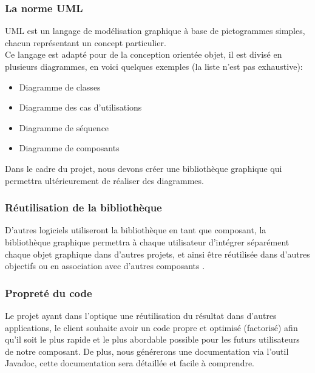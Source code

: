 \documentclass[12pt,a4paper,openany]{article}
\begin{document}
		\subsubsection{La norme UML} 
			UML est un langage de modélisation graphique à base de pictogrammes simples, chacun représentant un concept particulier.\\
			Ce langage est adapté pour de la conception orientée objet, il est divisé en plusieurs diagrammes, en voici quelques exemples (la liste n'est pas exhaustive): 
			\begin{itemize}
				\item Diagramme de classes
				\item Diagramme des cas d'utilisations
				\item Diagramme de séquence
				\item Diagramme de composants
			\end{itemize}
			Dans le cadre du projet, nous devons créer une bibliothèque graphique qui permettra ultérieurement de réaliser des diagrammes.
		\subsubsection{Réutilisation de la bibliothèque}
		D'autres logiciels utiliseront la bibliothèque en tant que composant,
		la bibliothèque graphique permettra à chaque utilisateur d'intégrer séparément chaque objet graphique dans d'autres projets,
		et ainsi être réutilisée dans d'autres objectifs ou en association avec d'autres composants .
		\subsubsection{Propreté du code}Le projet ayant dans l'optique une réutilisation du résultat dans d'autres applications,
		le client souhaite avoir un code propre et optimisé (factorisé) afin qu'il soit le plus rapide et le plus abordable possible pour
		les futurs utilisateurs de notre composant. De plus, nous générerons une documentation via l'outil Javadoc, cette documentation
		sera détaillée et facile à comprendre.
\end{document}
